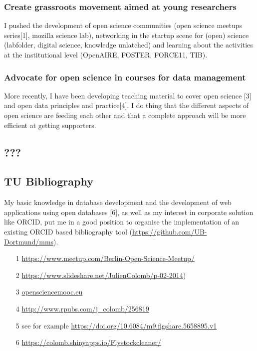 \subsubsection*{Create grassroots movement aimed at young researchers}
I pushed the development of open science communities (open science meetups series[1], mozilla science lab), networking in the startup scene for (open) science (labfolder, digital science, knowledge unlatched) and learning about the activities at the institutional level (OpenAIRE, FOSTER, FORCE11, TIB). 
\subsubsection*{Advocate for open science in courses for data management}
More recently, I have been developing teaching material to cover open science [3] and open data principles and practice[4]. I do thing that the different aspects of open science are feeding each other and that a complete approach will be more efficient at getting supporters. 



\subsection*{???}


\subsection*{TU Bibliography}

My basic knowledge in database development and the development of web applications using open databases [6], as well as my interest in corporate solution like ORCID, put me in a good position to organise the implementation of an existing ORCID based bibliography tool (\url{https://github.com/UB-Dortmund/mms}).


\begin{itemize}[noitemsep]

\item [1] \url{https://www.meetup.com/Berlin-Open-Science-Meetup/}
\item [2]  \url{https://www.slideshare.net/JulienColomb/p-02-2014})
\item [3] \url{opensciencemooc.eu}
\item [4] \url{http://www.rpubs.com/j_colomb/256819}
\item [5] see for example \url{https://doi.org/10.6084/m9.figshare.5658895.v1}
\item [6] \url{https://colomb.shinyapps.io/Flystockcleaner/}

\end{itemize}
